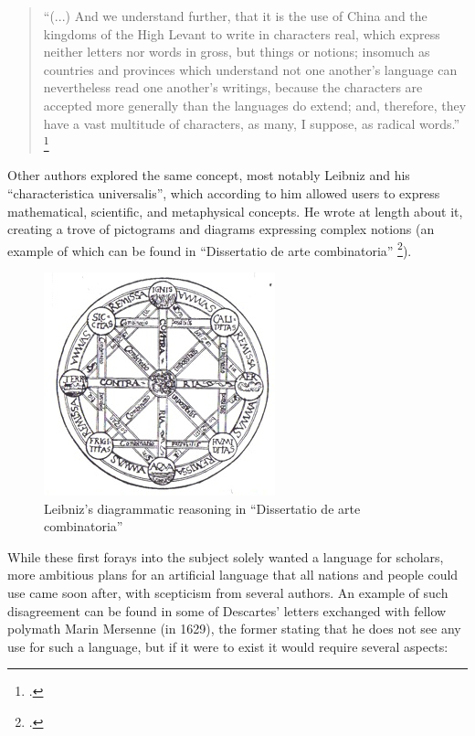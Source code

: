 \begin{quote}
    ``(...) And we understand further, that it is the use of China and the kingdoms of the High Levant to write in characters real, which express neither letters nor words in gross, but
    things or notions; insomuch as countries and provinces which understand not one another's language can nevertheless read one another's writings, because the characters are accepted
    more generally than the languages do extend; and, therefore, they have a vast multitude of characters, as many, I suppose, as radical words.''
    \footcite[(the position of the quote depends on the various editions and publishing formats of the book, but most commonly found in Book II, Chapter XVI)]{bacon1605proficience}
\end{quote}

Other authors explored the same concept, most notably Leibniz and his ``characteristica universalis'', which according to him allowed users to express mathematical, scientific, and metaphysical
concepts. He wrote at length about it, creating a trove of pictograms and diagrams expressing complex notions (an example of which can be found in
``Dissertatio de arte combinatoria'' \footcite{leibniz1666dissertatio}).

\begin{figure}[H]
\centering
\includegraphics[scale=0.9]{images/characteristica_universalis_diagram.jpg}
\caption{Leibniz's diagrammatic reasoning in ``Dissertatio de arte combinatoria''}
\end{figure}

\newpage
While these first forays into the subject solely wanted a language for scholars, more ambitious plans for an artificial language that all nations and people could use came soon after,
with scepticism from several authors. An example of such disagreement can be found in some of Descartes' letters exchanged with fellow polymath Marin Mersenne (in 1629), the former
stating that he does not see any use for such a language, but if it were to exist it would require several aspects:

